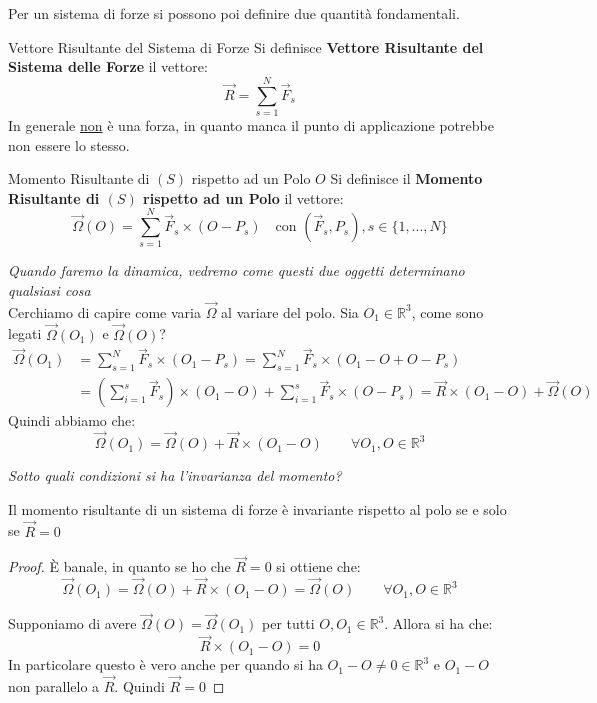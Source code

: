 \documentclass[11pt,a4paper,twoside]{article}
\theoremstyle{definition}
\begin{document}
Per un sistema di forze si possono poi definire due quantità fondamentali.

\begin{defn}{Vettore Risultante del Sistema di Forze}{}
	Si definisce \textbf{Vettore Risultante del Sistema delle Forze} il vettore:
	\[ \vec R = \sum_{s = 1}^N \vec F_s \]
	In generale \underline{non} è una forza, in quanto manca il punto di applicazione potrebbe non essere lo stesso.
\end{defn}

\begin{defn}{Momento Risultante di $(S)$ rispetto ad un Polo $O$}{}
	Si definisce il \textbf{Momento Risultante di $(S)$ rispetto ad un Polo} il vettore:
	\[ \vec \Omega(O) = \sum_{s = 1}^N \vec F_s \times (O-P_s)\quad \text{con }(\vec F_s, P_s), s \in \{1,...,N\} \]
\end{defn}

\textit{Quando faremo la dinamica, vedremo come questi due oggetti determinano qualsiasi cosa}\\
Cerchiamo di capire come varia $\vec \Omega$ al variare del polo. Sia $O_1 \in \mathbb R^3$, come sono legati $\vec \Omega(O_1)$ e $\vec \Omega(O)$?
\begin{align*}
	\vec \Omega(O_1) &= \sum_{s = 1}^N \vec F_s \times (O_1 - P_s) = \sum_{s = 1}^N \vec F_s \times (O_1-O+O-P_s)\\
	&= \left( \sum_{i = 1}^s \vec F_s \right) \times (O_1-O) + \sum_{i = 1}^s \vec F_s \times (O-P_s) = \vec R \times (O_1-O) + \vec \Omega(O)
\end{align*}
Quindi abbiamo che:
\[ \vec \Omega(O_1) = \vec \Omega(O) + \vec R \times (O_1-O)\qquad \forall O_1,O \in \mathbb R^3 \]

\textit{Sotto quali condizioni si ha l'invarianza del momento?}

\begin{prop}{}{}
	Il momento risultante di un sistema di forze è invariante rispetto al polo se e solo se $\vec R=0$
\end{prop}

\begin{proof}
	 È banale, in quanto se ho che $\vec R = 0$ si ottiene che:
	\[ \vec \Omega(O_1) = \vec \Omega(O) + \vec R \times (O_1-O) = \vec \Omega(O) \qquad \forall O_1,O \in \mathbb R^3\]

	 Supponiamo di avere $\vec \Omega(O) = \vec \Omega(O_1)$ per tutti $O,O_1 \in \mathbb R^3$. Allora si ha che:
	\[ \vec R \times (O_1-O)=0 \]
	In particolare questo è vero anche per quando si ha $O_1-O \neq 0 \in \mathbb R^3$ e $O_1-O$ non parallelo a $\vec R$. Quindi $\vec R = 0$
\end{proof}
\end{document}
